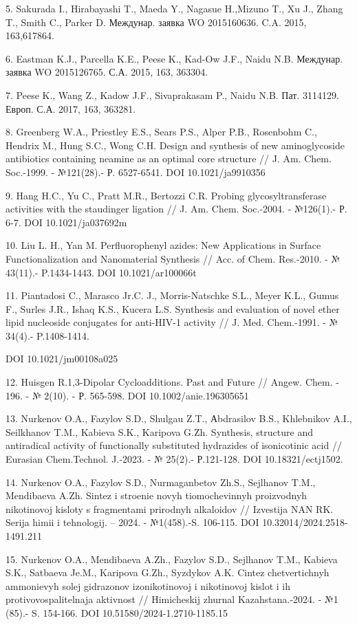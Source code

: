 5. Sakurada I., Hirabayashi T., Maeda Y., Nagasue H.,Mizuno T., Xu J.,
Zhang T., Smith C., Parker D. Междунар. заявка WO 2015160636. C.A. 2015,
163,617864.

6. Eastman K.J., Parcella K.E., Peese K., Kad-Ow J.F., Naidu N.B.
Междунар. заявка WO 2015126765. С.А. 2015, 163, 363304.

7. Peese K., Wang Z., Kadow J.F., Sivaprakasam P., Naidu N.B. Пат.
3114129. Европ. С.А. 2017, 163, 363281.

8. Greenberg W.A., Priestley E.S., Sears P.S., Alper P.B., Rosenbohm C.,
Hendrix M., Hung S.C., Wong C.H. Design and synthesis of new
aminoglycoside antibiotics containing neamine as an optimal core
structure // J. Am. Chem. Soc.-1999. - №121(28).- Р. 6527-6541. DOI
10.1021/ja9910356

9. Hang H.C., Yu C., Pratt M.R., Bertozzi C.R. Probing
glycosyltransferase activities with the staudinger ligation // J. Am.
Chem. Soc.-2004. - №126(1).- Р. 6-7. DOI 10.1021/ja037692m

10. Liu L. H., Yan M. Perfluorophenyl azides: New Applications in
Surface Functionalization and Nanomaterial Synthesis // Acc. of Chem.
Res.-2010. - № 43(11).- P.1434-1443. DOI 10.1021/ar100066t

11. Piantadosi C., Marasco Jr.C. J., Morris-Natschke S.L., Meyer K.L.,
Gumus F., Surles J.R., Ishaq K.S., Kucera L.S. Synthesis and evaluation
of novel ether lipid nucleoside conjugates for anti-HIV-1 activity // J.
Med. Chem.-1991. - № 34(4).- P.1408-1414.

DOI 10.1021/jm00108a025

12. Huisgen R.1,3-Dipolar Cycloadditions. Past and Future // Angew.
Chem. - 196. - № 2(10). - Р. 565-598. DOI 10.1002/anie.196305651

13. Nurkenov O.A., Fazylov S.D., Shulgau Z.T., Аbdrasilov B.S.,
Khlebnikov A.I., Seilkhanov T.M., Kabieva S.K., Karipova G.Zh.
Synthesis, structure and antiradical activity of functionally
substituted hydrazides of isonicotinic acid // Eurasian Chem.Technol.
J.-2023. - № 25(2).- Р.121-128. DOI 10.18321/ectj1502.

14. Nurkenov O.A., Fazylov S.D., Nurmaganbetov Zh.S., Sejlhanov T.M.,
Mendibaeva A.Zh. Sintez i stroenie novyh tiomochevinnyh proizvodnyh
nikotinovoj kisloty s fragmentami prirodnyh alkaloidov // Izvestija NAN
RK. Serija himii i tehnologij. -- 2024. - №1(458).-S. 106-115. DOI
10.32014/2024.2518-1491.211

15. Nurkenov O.A., Mendibaeva A.Zh., Fazylov S.D., Sejlhanov T.M.,
Kabieva S.K., Satbaeva Je.M., Karipova G.Zh., Syzdykov A.K. Cintez
chetvertichnyh ammonievyh solej gidrazonov izonikotinovoj i nikotinovoj
kislot i ih protivovospalitel\textquotesingle naja
aktivnost\textquotesingle{} // Himicheskij zhurnal Kazahstana.-2024. -
№1 (85).- S. 154-166. DOI 10.51580/2024-1.2710-1185.15

